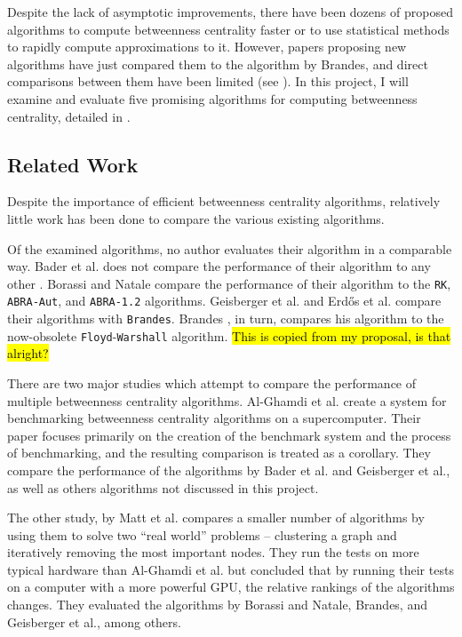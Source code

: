 \documentclass[a4paper,12pt]{article}
\begin{document}
Despite the lack of asymptotic improvements, there have been dozens of proposed algorithms to compute betweenness centrality faster or to use statistical methods to rapidly compute approximations to it. However, papers proposing new algorithms have just compared them to the algorithm by Brandes, and direct comparisons between them have been limited (see \textit{}). In this project, I will examine and evaluate five promising algorithms for computing betweenness centrality, detailed in \textit{}.

\subsection{Related Work}\label{sec:related_work}

Despite the importance of efficient betweenness centrality algorithms, relatively little work has been done to compare the various existing algorithms.

Of the examined algorithms, no author evaluates their algorithm in a comparable way. Bader et al. does not compare the performance of their algorithm to any other \cite{bader}. Borassi and Natale \cite{borassi} compare the performance of their algorithm to the \texttt{RK}, \texttt{ABRA-Aut}, and \texttt{ABRA-1.2} algorithms. Geisberger et al. \cite{geisberger} and Erd\H{o}s et al. \cite{erdos} compare their algorithms with \texttt{Brandes}. Brandes \cite{brandes}, in turn, compares his algorithm to the now-obsolete \texttt{Floyd}-\texttt{Warshall} algorithm. \hl{This is copied from my proposal, is that alright?}

There are two major studies which attempt to compare the performance of multiple betweenness centrality algorithms. Al-Ghamdi et al. \cite{comparebig} create a system for benchmarking betweenness centrality algorithms on a supercomputer. Their paper focuses primarily on the creation of the benchmark system and the process of benchmarking, and the resulting comparison is treated as a corollary. They compare the performance of the algorithms by Bader et al. and Geisberger et al., as well as others algorithms not discussed in this project.

The other study, by Matt et al. \cite{comparesmall} compares a smaller number of algorithms by using them to solve two ``real world'' problems -- clustering a graph and iteratively removing the most important nodes. They run the tests on more typical hardware than Al-Ghamdi et al. but concluded that by running their tests on a computer with a more powerful GPU, the relative rankings of the algorithms changes. They evaluated the algorithms by Borassi and Natale, Brandes, and Geisberger et al., among others.
\end{document}
